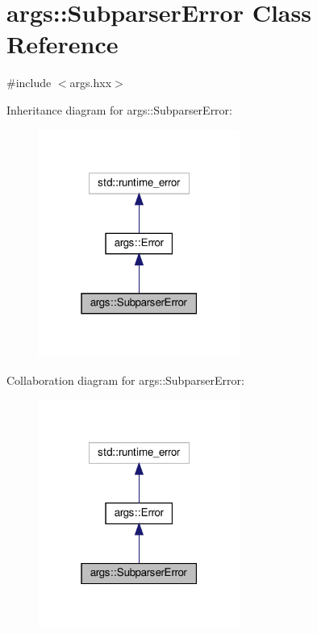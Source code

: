 \hypertarget{classargs_1_1_subparser_error}{}\section{args\+:\+:Subparser\+Error Class Reference}
\label{classargs_1_1_subparser_error}


{\ttfamily \#include $<$args.\+hxx$>$}



Inheritance diagram for args\+:\+:Subparser\+Error\+:\nopagebreak
\begin{figure}[H]
\begin{center}
\leavevmode
\includegraphics[width=187pt]{classargs_1_1_subparser_error__inherit__graph}
\end{center}
\end{figure}


Collaboration diagram for args\+:\+:Subparser\+Error\+:\nopagebreak
\begin{figure}[H]
\begin{center}
\leavevmode
\includegraphics[width=187pt]{classargs_1_1_subparser_error__coll__graph}
\end{center}
\end{figure}
